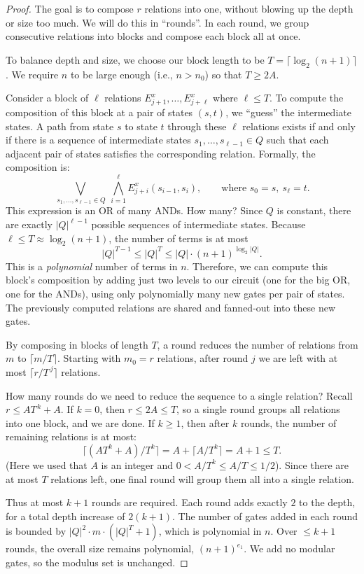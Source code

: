 \documentclass[11pt]{article}
\theoremstyle{definition}
\theoremstyle{remark}
\begin{document}
\begin{proof}
The goal is to compose $r$ relations into one, without blowing up the depth or size too much. We will do this in ``rounds''. In each round, we group consecutive relations into blocks and compose each block all at once.

To balance depth and size, we choose our block length to be $T=\lceil\log_2(n+1)\rceil$. We require $n$ to be large enough (i.e., $n>n_0$) so that $T\ge 2A$.

Consider a block of $\ell$ relations $E^x_{j+1},\dots,E^x_{j+\ell}$ where $\ell\le T$. To compute the composition of this block at a pair of states $(s,t)$, we ``guess'' the intermediate states. A path from state $s$ to state $t$ through these $\ell$ relations exists if and only if there is a sequence of intermediate states $s_1,\dots,s_{\ell-1} \in Q$ such that each adjacent pair of states satisfies the corresponding relation.
Formally, the composition is:
\[
\bigvee_{\,s_1,\dots,s_{\ell-1}\in Q}\ \bigwedge_{i=1}^{\ell}
E^x_{j+i}(s_{i-1},s_i),\qquad \text{where } s_0=s,\ s_\ell=t.
\]
This expression is an $\mathrm{OR}$ of many $\mathrm{AND}$s. How many? Since $Q$ is constant, there are exactly $|Q|^{\ell-1}$ possible sequences of intermediate states. Because $\ell \le T \approx \log_2(n+1)$, the number of terms is at most
\[ |Q|^{T-1} \le |Q|^T \le |Q| \cdot (n+1)^{\log_2|Q|}. \]
This is a \emph{polynomial} number of terms in $n$. Therefore, we can compute this block's composition by adding just two levels to our circuit (one for the big $\mathrm{OR}$, one for the $\mathrm{AND}$s), using only polynomially many new gates per pair of states. The previously computed relations are shared and fanned-out into these new gates.

By composing in blocks of length $T$, a round reduces the number of relations from $m$ to $\lceil m/T\rceil$. Starting with $m_0=r$ relations, after round $j$ we are left with at most $\lceil r/T^{\,j}\rceil$ relations.

How many rounds do we need to reduce the sequence to a single relation?
Recall $r\le A T^{\,k}+A$.
If $k=0$, then $r\le 2A \le T$, so a single round groups all relations into one block, and we are done.
If $k\ge 1$, then after $k$ rounds, the number of remaining relations is at most:
\[ \lceil (AT^k+A)/T^k\rceil = A + \lceil A/T^k\rceil = A+1 \le T. \]
(Here we used that $A$ is an integer and $0 < A/T^k \le A/T \le 1/2$).
Since there are at most $T$ relations left, one final round will group them all into a single relation.

Thus at most $k+1$ rounds are required. Each round adds exactly $2$ to the depth, for a total depth increase of $2(k+1)$. The number of gates added in each round is bounded by $|Q|^2 \cdot m \cdot (|Q|^T + 1)$, which is polynomial in $n$. Over $\le k+1$ rounds, the overall size remains polynomial, $(n+1)^{e_1}$. We add no modular gates, so the modulus set is unchanged.
\end{proof}
\end{document}
